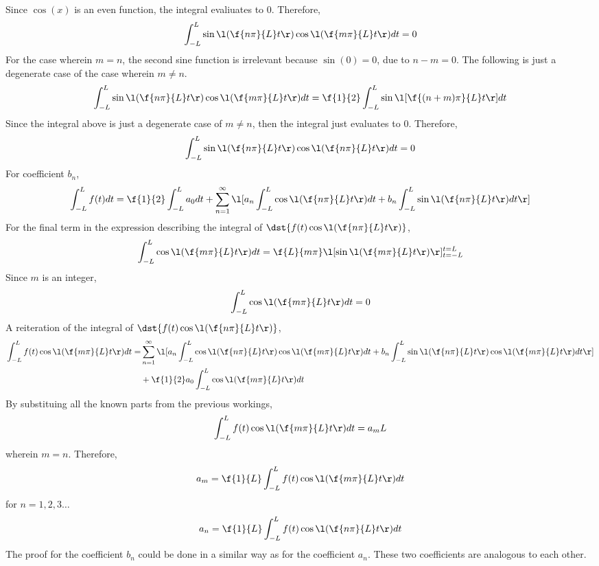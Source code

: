 Since $\cos(x)$ is an even function, the integral evaliuates to 0. Therefore,
$$\int_{-L}^{L}\sin\l(\f{n\pi}{L}t\r)\cos\l(\f{m\pi}{L}t\r)dt = 0$$
For the case wherein $m = n$, the second sine function is irrelevant because $\sin(0) = 0$, due to $n-m=0$. The following is just a degenerate case of the case wherein $m\neq n$.
$$\int_{-L}^{L}\sin\l(\f{n\pi}{L}t\r)\cos\l(\f{m\pi}{L}t\r)dt = \f{1}{2}\int_{-L}^{L}\sin\l[\f{(n+m)\pi}{L}t\r]dt$$
Since the integral above is just a degenerate case of $m\neq n$, then the integral just evaluates to $0$. Therefore,
$$\int_{-L}^{L}\sin\l(\f{n\pi}{L}t\r)\cos\l(\f{n\pi}{L}t\r)dt = 0$$
For coefficient $b_n$,
$$\int_{-L}^{L}f(t)dt = \f{1}{2} \int_{-L}^{L}a_0dt + \sum_{n = 1}^{\infty}\l[a_n \int_{-L}^{L}\cos\l(\f{n\pi}{L}t\r)dt + b_n \int_{-L}^{L}\sin\l(\f{n\pi}{L}t\r)dt\r]$$
For the final term in the expression describing the integral of $\dst{f(t)\cos\l(\f{n\pi}{L}t\r)}$, 
$$\int_{-L}^{L}\cos\l(\f{m\pi}{L}t\r)dt = \f{L}{m\pi}\l[\sin\l(\f{m\pi}{L}t\r)\r]^{t=L}_{t=-L}$$
Since $m$ is an integer,
$$\int_{-L}^{L}\cos\l(\f{m\pi}{L}t\r)dt = 0$$
A reiteration of the integral of $\dst{f(t)\cos\l(\f{n\pi}{L}t\r)}$,
 \begin{align*}
\int_{-L}^{L}f(t)\cos\l(\f{m\pi}{L}t\r)dt = &\sum_{n = 1}^{\infty}\l[a_n \int_{-L}^{L}\cos\l(\f{n\pi}{L}t\r)\cos\l(\f{m\pi}{L}t\r)dt + b_n \int_{-L}^{L}\sin\l(\f{n\pi}{L}t\r)\cos\l(\f{m\pi}{L}t\r)dt\r] \\ &+ \f{1}{2}a_0 \int_{-L}^{L}\cos\l(\f{m\pi}{L}t\r)dt
\end{align*}
By substituing all the known parts from the previous workings, 
$$\int_{-L}^{L}f(t)\cos\l(\f{m\pi}{L}t\r)dt = a_m L$$
wherein $m = n$. Therefore,
$$a_m = \f{1}{L}\int_{-L}^{L}f(t)\cos\l(\f{m\pi}{L}t\r)dt$$
for $n=1,2,3\dots$
$$a_n = \f{1}{L}\int_{-L}^{L}f(t)\cos\l(\f{n\pi}{L}t\r)dt$$
The proof for the coefficient $b_n$ could be done in a similar way as for the coefficient $a_n$. These two coefficients are analogous to each other.
